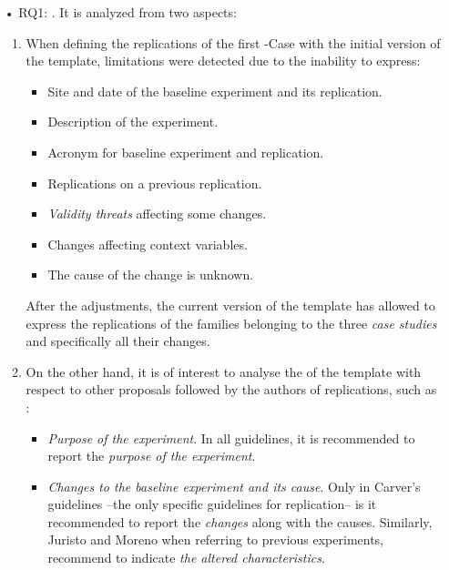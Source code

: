 \begin{itemize}
    \item[•] RQ1: \emph{\Expressiveness}. It is analyzed from two aspects:
	
	\begin{enumerate}
        \item  When defining the replications of the first \SoftEng-Case with the initial version of the template, limitations were detected due to the inability to express: 
    
        \begin{itemize}
	        \item Site and date of the baseline experiment and its replication.
	        \item Description of the experiment.
	        \item Acronym for baseline experiment and replication.
	        \item Replications on a previous replication.
	        \item \emph{Validity threats} affecting some changes.
	        \item Changes affecting context variables.
	        \item The cause of the change is unknown.
        \end{itemize}

    After the adjustments, the current version of the template has allowed to express the replications of the families belonging to the three \emph{case studies} and specifically all their changes. 

    \item On the other hand, it is of interest to analyse the \emph{\expressiveness} of the template with respect to other proposals followed by the authors of replications, such as \cite{carver2010towards,wohlin:experimentation,jedlitschka2008reporting,juristo2013basics,runeson2009guidelines}:
    
    \begin{itemize}
        
	    \item \emph{Purpose of the experiment}. In all guidelines, it is recommended to report the \emph{purpose of the experiment}. 
	
	    \item \emph{Changes to the baseline experiment and its cause}. Only in Carver's guidelines \cite{carver2010towards} --the only specific guidelines for replication-- is it recommended to report the \emph{changes} along with the causes. Similarly, Juristo and Moreno \cite{juristo2013basics} when referring to previous experiments, recommend to indicate \emph{the altered characteristics}.
	

\end{itemize}
\end{enumerate}
\end{itemize}
